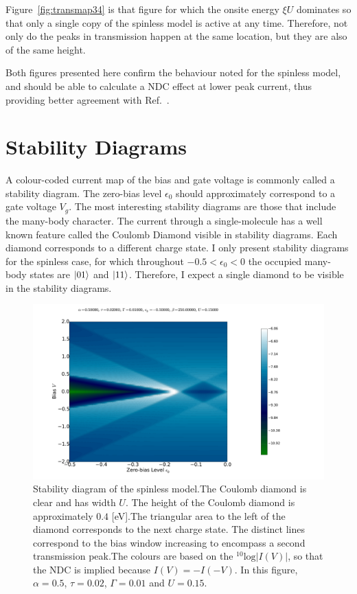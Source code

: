 Figure~\ref{fig:transmap34} is that figure for which the onsite energy $\xi U$ dominates so that only a single copy of the spinless model is active at any time. Therefore, not only do the peaks in transmission happen at the same location, but they are also of the same height.

Both figures presented here confirm the behaviour noted for the spinless model, and should be able to calculate a NDC effect at lower peak current, thus providing better agreement with Ref.~\cite{perrinnano}.


\clearpage\section{Stability Diagrams}
\label{sec:twositeparamsweep}
A colour-coded current map of the bias and gate voltage is commonly called a stability diagram. The zero-bias level $\epsilon_0$ should approximately correspond to a gate voltage $V_g$. The most interesting stability diagrams are those that include the many-body character. The current through a single-molecule has a well known feature called the Coulomb Diamond \cite{seldenthuis, perrin} visible in stability diagrams. Each diamond corresponds to a different charge state. I only present stability diagrams for the spinless case, for which throughout $-0.5 < \epsilon_0 < 0$ the occupied many-body states are $\ket{01}$ and $\ket{11}$. Therefore, I expect a single diamond to be visible in the stability diagrams.  

\begin{figure}[htb]
    \centering
    \includegraphics[height=.38\textheight]{pdf/coulombd/current_map_u2.pdf}
    \caption{Stability diagram of the spinless model.The Coulomb diamond is clear and has width $U$. The height of the Coulomb diamond is approximately $0.4$ [eV].The triangular area to the left of the diamond corresponds to the next charge state. The distinct lines correspond to the bias window increasing to encompass a second transmission peak.The colours are based on the $^{10}\text{log}\left|I(V)\right|$, so that the NDC is implied because $I(V) = -I(-V)$. In this figure, $\alpha=0.5$, $\tau=0.02$, $\Gamma = 0.01$ and $U=0.15$.}
    \label{fig:currentmap2}
\end{figure} 

